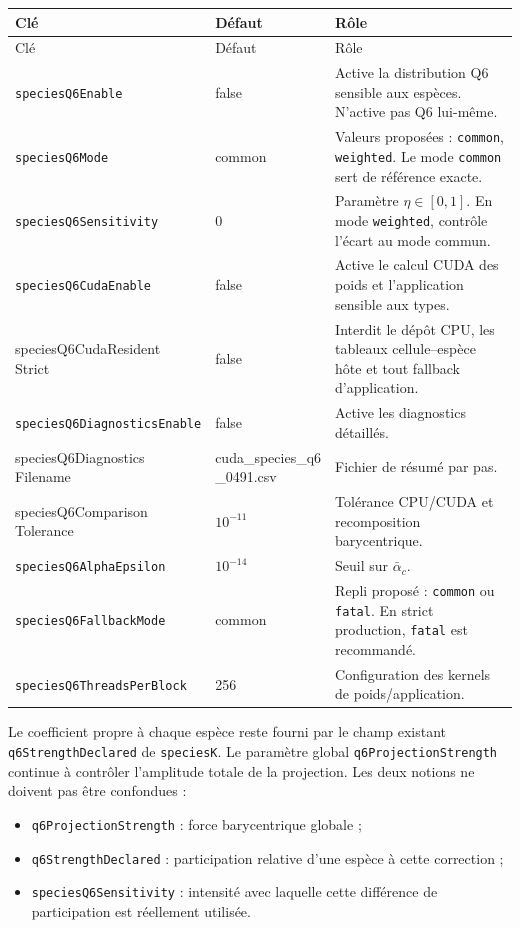\documentclass[11pt,a4paper]{article}
\newcommand{\code}[1]{\texttt{#1}}
\begin{document}
\begin{longtable}{@{}p{}p{}p{}@{}}
\toprule
Clé & Défaut & Rôle \\
\midrule
\endfirsthead
\toprule
Clé & Défaut & Rôle \\
\midrule
\endhead
\code{speciesQ6Enable} & false & Active la distribution Q6 sensible aux espèces. N'active pas Q6 lui-même. \\
\code{speciesQ6Mode} & common & Valeurs proposées : \code{common}, \code{weighted}. Le mode \code{common} sert de référence exacte. \\
\code{speciesQ6Sensitivity} & 0 & Paramètre \(\eta\in[0,1]\). En mode \code{weighted}, contrôle l'écart au mode commun. \\
\code{speciesQ6CudaEnable} & false & Active le calcul CUDA des poids et l'application sensible aux types. \\
\shortstack[l]{\ttfamily speciesQ6CudaResident\\\ttfamily Strict} & false & Interdit le dépôt CPU, les tableaux cellule--espèce hôte et tout fallback d'application. \\
\code{speciesQ6DiagnosticsEnable} & false & Active les diagnostics détaillés. \\
\shortstack[l]{\ttfamily speciesQ6Diagnostics\\\ttfamily Filename} & \shortstack[l]{\ttfamily cuda\_species\_q6\\\ttfamily \_0491.csv} & Fichier de résumé par pas. \\
\shortstack[l]{\ttfamily speciesQ6Comparison\\\ttfamily Tolerance} & $10^{-11}$ & Tolérance CPU/CUDA et recomposition barycentrique. \\
\code{speciesQ6AlphaEpsilon} & $10^{-14}$ & Seuil sur \(\bar\alpha_c\). \\
\code{speciesQ6FallbackMode} & common & Repli proposé : \code{common} ou \code{fatal}. En strict production, \code{fatal} est recommandé. \\
\code{speciesQ6ThreadsPerBlock} & 256 & Configuration des kernels de poids/application. \\
\bottomrule
\end{longtable}

Le coefficient propre à chaque espèce reste fourni par le champ existant \code{q6StrengthDeclared} de \code{speciesK}. Le paramètre global \code{q6ProjectionStrength} continue à contrôler l'amplitude totale de la projection. Les deux notions ne doivent pas être confondues :
\begin{itemize}
  \item \code{q6ProjectionStrength} : force barycentrique globale ;
  \item \code{q6StrengthDeclared} : participation relative d'une espèce à cette correction ;
  \item \code{speciesQ6Sensitivity} : intensité avec laquelle cette différence de participation est réellement utilisée.
\end{itemize}
\end{document}

